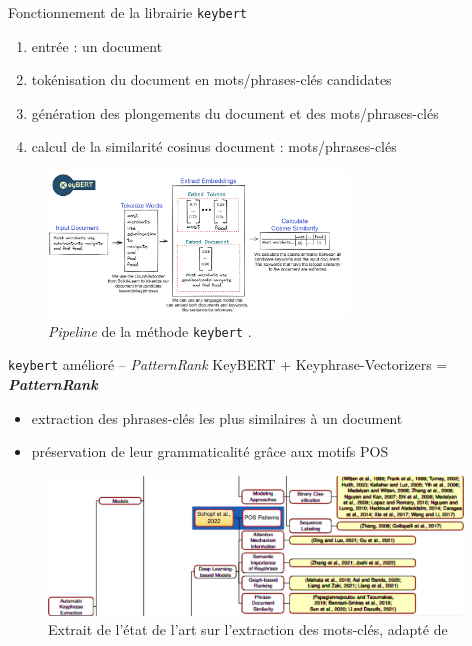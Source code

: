 \begin{frame}{Fonctionnement de la librairie \texttt{keybert}}
\begin{enumerate}
\item entrée : un document
\item tokénisation du document en mots/phrases-clés candidates
\item génération des plongements du document et des mots/phrases-clés
\item calcul de la similarité cosinus document : mots/phrases-clés
\end{enumerate}
\begin{figure}
    \centering
    \includegraphics[width=80mm,scale=0.5]{pic/keybert.png}
    \caption{\textit{Pipeline} de la méthode \texttt{keybert} \citep{grootendorst2020keybert}.}
    \label{fig:enter-label}
\end{figure}
\end{frame}


\begin{frame}{\texttt{keybert} amélioré -- \textit{PatternRank}}
Key\textsc{BERT} + Keyphrase-Vectorizers = \textit{\textbf{PatternRank}} \hfill \citep{schopf2022}
\begin{itemize}
\item extraction des phrases-clés les plus similaires à un document
\item préservation de leur grammaticalité grâce aux motifs POS
\end{itemize}
\begin{figure}
    \centering
    \includegraphics[width=110mm,scale=0.5]{pic/sota_lm_adapte.png}
    \caption{Extrait de l'état de l'art sur l'extraction des mots-clés, adapté de \citet{xie2023}}
    \label{fig:enter-label}
\end{figure}
\end{frame}

